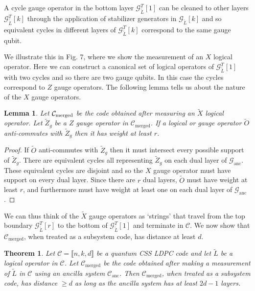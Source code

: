 \documentclass[reprint,
superscriptaddress,
 amsmath,amssymb,
 aps, longbibliography
]{revtex4-1}
\newtheorem{lemma}{Lemma}
\newtheorem{theorem}{Theorem}
\newcommand{\rev}[1]{{#1}}
\begin{document}
A cycle gauge operator in the bottom layer $\mathcal{G}^T_{\tilde{L}}[1]$ can be cleaned to other layers $\mathcal{G}^T_{\tilde{L}}[k]$ through the application of stabilizer generators in $\mathcal{G}_{\tilde{L}}[k]$ and so equivalent cycles in different layers of $\mathcal{G}^T_{\tilde{L}}[k]$ correspond to the same gauge qubit.

We illustrate this in Fig. 7, where we show the measurement of an $X$ logical operator. Here we can construct a \rev{canonical set of logical operators} of $\mathcal{G}^T_{\tilde{L}}[1]$ with two cycles and so there are two gauge qubits. In this case the cycles correspond to $Z$ gauge operators. The following lemma tells us about the nature of the $X$ gauge operators.

\begin{lemma} \label{lemma:gauge}
Let $\mathcal{C}_{\rm merged}$ be the code obtained after measuring an $\tilde{X}$ logical operator. Let $\tilde{Z}_g$ be a $Z$ gauge operator in $\mathcal{C}_{\textrm{merged}}$. If a logical or gauge operator $\tilde{O}$ anti-commutes with $\tilde{Z}_g$ then it has weight at least $r$.
\end{lemma}

\begin{proof}
If $\tilde{O}$ anti-commutes with $\tilde{Z}_g$ then it must intersect every possible support of $\tilde{Z}_g$. There are equivalent cycles all representing $\tilde{Z}_g$ on each dual layer of $\mathcal{G}_{\textrm{anc}}$. These equivalent cycles are disjoint and so the $X$ gauge operator must have support on every dual layer. Since there are $r$ dual layers, $\tilde{O}$ must have weight at least $r$, and furthermore must have weight at least one on each dual layer of $\mathcal{G}_{\textrm{anc}}$.
\end{proof}

We can thus think of the $\tilde{X}$ gauge operators as `strings' that travel from the top boundary $\mathcal{G}^T_{\tilde{L}}[r]$ to the bottom of $\mathcal{G}^T_{\tilde{L}}[1]$ and terminate in $\mathcal{C}$. We now show that $\mathcal{C}_{\text{merged}}$, when treated as a subsystem code, has distance at least $d$.


\begin{theorem}
Let $\mathcal{C} = \llbracket n, k, d \rrbracket$ be a quantum CSS LDPC code and let $\tilde{L}$ be a logical operator in $\mathcal{C}$. Let $\mathcal{C}_{\text{merged}}$ be the code obtained after making a measurement of $\tilde{L}$ in $\mathcal{C}$ using an ancilla system $\mathcal{C}_{\textrm{anc}}$. Then $\mathcal{C}_{\text{merged}}$, when treated as a subsystem code, has distance $\geq d$ as long as the ancilla system has at least $2d-1$ layers.
\end{theorem}
\end{document}
